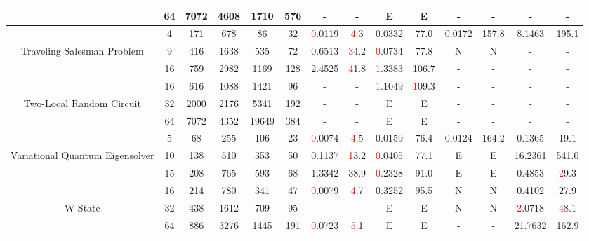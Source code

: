 \begin{table}[htb]
{\begin{tabular}{|c|c|c|c|c|c|c|c|c|c|c|c|c|c|}
 & 
64 & 7072 & 4608 & 1710 & 576
 & - & -
 & E & E
 & - & -
 & - & -
 \\
\hline
 & 
4 & 171 & 678 & 86 & 32
 & \textcolor{red}0.0119 & \textcolor{red}4.3
 & 0.0332 & 77.0
 & 0.0172 & 157.8
 & 8.1463 & 195.1
 \\
Traveling Salesman Problem & 
9 & 416 & 1638 & 535 & 72
 & 0.6513 & \textcolor{red}34.2
 & \textcolor{red}0.0734 & 77.8
 & N & N 
 & - & -
 \\
 & 
16 & 759 & 2982 & 1169 & 128
 & 2.4525 & \textcolor{red}41.8
 & \textcolor{red}1.3383 & 106.7
 & - & -
 & - & -
 \\
\hline
 & 
16 & 616 & 1088 & 1421 & 96
 & - & -
 & \textcolor{red}1.1049 & \textcolor{red}109.3
 & - & -
 & - & -
 \\
Two-Local Random Circuit & 
32 & 2000 & 2176 & 5341 & 192
 & - & -
 & E & E
 & - & -
 & - & -
 \\
 & 
64 & 7072 & 4352 & 19649 & 384
 & - & -
 & E & E
 & - & -
 & - & -
 \\
\hline
 & 
5 & 68 & 255 & 106 & 23
 & \textcolor{red}0.0074 & \textcolor{red}4.5
 & 0.0159 & 76.4
 & 0.0124 & 164.2
 & 0.1365 & 19.1
 \\
Variational Quantum Eigensolver & 
10 & 138 & 510 & 353 & 50
 & 0.1137 & \textcolor{red}13.2
 & \textcolor{red}0.0405 & 77.1
 & E & E
 & 16.2361 & 541.0
 \\
 & 
15 & 208 & 765 & 593 & 68
 & 1.3342 & 38.9
 & \textcolor{red}0.2328 & 91.0
 & E & E
 & 0.4853 & \textcolor{red}29.3
 \\
\hline
 & 
16 & 214 & 780 & 341 & 47
 & \textcolor{red}0.0079 & \textcolor{red}4.7
 & 0.3252 & 95.5
 & N & N 
 & 0.4102 & 27.9
 \\
W State & 
32 & 438 & 1612 & 709 & 95
 & - & -
 & E & E
 & N & N 
 & \textcolor{red}2.0718 & \textcolor{red}48.1
 \\
 & 
64 & 886 & 3276 & 1445 & 191
 & \textcolor{red}0.0723 & \textcolor{red}5.1
 & E & E
 & - & -
 & 21.7632 & 162.9
 \\
\hline
\end{tabular}}
\end{table}